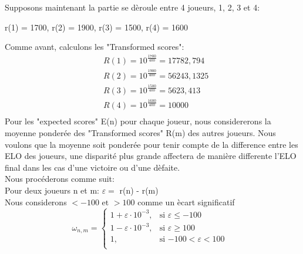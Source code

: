     Supposons maintenant la partie se dèroule entre 4 joueurs, 1, 2, 3 et 4:
    \begin{center}
        r(1) = 1700, r(2) = 1900, r(3) = 1500, r(4) = 1600
    \end{center}
    Comme avant, calculons les "Transformed scores":
        \begin{equation}
            \begin{split}
                & R(1) = 10^{\frac{1700}{400}} = 17782,794 \\
                & R(2) = 10^{\frac{1900}{400}} = 56243,1325 \\
                & R(3) = 10^{\frac{1500}{400}} = 5623, 413  \\
                & R(4) = 10^{\frac{1600}{400}} = 10000 \\
            \end{split}
        \end{equation}
        Pour les "expected scores" E(n) pour chaque joueur, nous considererons la moyenne ponderée des "Transformed scores" R(m) des autres joueurs. 
        Nous voulons que la moyenne soit ponderée pour tenir compte de la difference entre les ELO des joueurs, une disparité plus grande affectera 
        de manière differente l'ELO final dans les cas d'une victoire ou d'une dèfaite.  \\
        Nous procéderons comme suit: \\
        Pour deux joueurs n et m: $\varepsilon = $ r(n) - r(m)  \\
        Nous considerons $< -100 \text{ et } > 100$ comme un ècart significatif
            $$ \omega_{n, m} =
            \begin{cases}
                1 + \varepsilon \cdot 10^{-3}, & \text{si $\varepsilon \le -100$} \\
                1 - \varepsilon \cdot 10^{-3}, & \text{si $\varepsilon \ge 100$} \\
                1, & \text{si $-100 < \varepsilon < 100$ }\\
            \end{cases} $$
        
